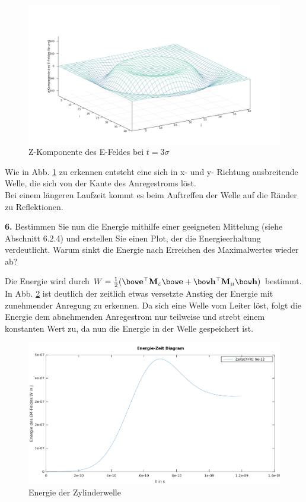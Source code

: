 \documentclass[Protokollheft.tex]{subfiles}
\begin{document}
\begin{figure}[h]
	\centering
	\includegraphics[width=0.7\linewidth]{Welle}
	\caption{Z-Komponente des E-Feldes bei $t= 3\sigma$}
	\label{fig:welle}
\end{figure}
\noindent
Wie in Abb. \ref{fig:welle} zu erkennen entsteht eine sich in x- und y- Richtung ausbreitende Welle, die sich von der Kante des Anregestroms löst.\\
Bei einem längeren Laufzeit kommt es beim Auftreffen der Welle auf die Ränder zu Reflektionen.

\begin{framed}
	\noindent \textbf{6.} Bestimmen Sie nun die Energie mithilfe einer geeigneten Mittelung (siehe Abschnitt 6.2.4) und erstellen Sie einen Plot, der die Energieerhaltung verdeutlicht. Warum sinkt die Energie nach Erreichen des Maximalwertes wieder ab?\label{exer:energyConservation}
\end{framed}
\noindent
Die Energie wird durch $W=\frac{1}{2}(\efit^\top\Meps\efit+\hfit^\top\Mmu\hfit)$ bestimmt. In Abb. \ref{fig:enegiedesfeldes} ist deutlich der zeitlich etwas versetzte Anstieg der Energie mit zunehmender Anregung zu erkennen. Da sich eine Welle vom Leiter löst, folgt die Energie dem abnehmenden Anregestrom nur teilweise und strebt einem konstanten Wert zu, da nun die Energie in der Welle gespeichert ist.
\begin{figure}[h]
	\centering
	\includegraphics[width=0.7\linewidth]{EnegiedesFeldes}
	\caption{Energie der Zylinderwelle}
	\label{fig:enegiedesfeldes}
\end{figure}
\end{document}

